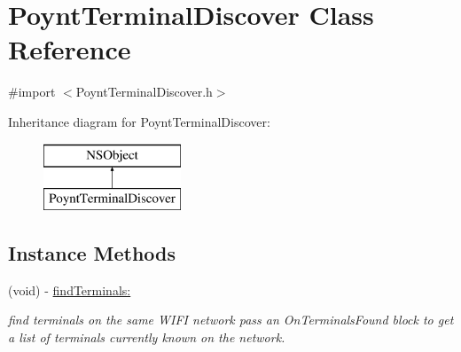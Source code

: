 \hypertarget{interface_poynt_terminal_discover}{}\section{Poynt\+Terminal\+Discover Class Reference}
\label{interface_poynt_terminal_discover}


{\ttfamily \#import $<$Poynt\+Terminal\+Discover.\+h$>$}

Inheritance diagram for Poynt\+Terminal\+Discover\+:\begin{figure}[H]
\begin{center}
\leavevmode
\includegraphics[height=2.000000cm]{interface_poynt_terminal_discover}
\end{center}
\end{figure}
\subsection*{Instance Methods}
\begin{DoxyCompactItemize}
\item 
(void) -\/ \hyperlink{interface_poynt_terminal_discover_aab8fdef29321b4bf9ff4ba57e1593e9a}{find\+Terminals\+:}
\begin{DoxyCompactList}\small\item\em find terminals on the same W\+I\+FI network  pass an On\+Terminals\+Found block to get a list of terminals currently known on the network. \end{DoxyCompactList}\end{DoxyCompactItemize}
